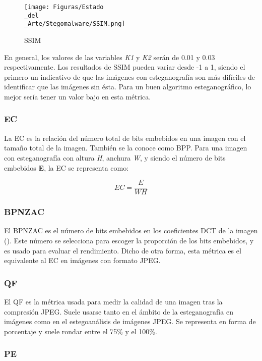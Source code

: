 \begin{figure}[H]
  \centering
  \texttt{[image: Figuras/Estado\\\_del\\\_Arte/Stegomalware/SSIM.png]}
  \label{fig:SSIM}
  \caption{SSIM}
\end{figure}

En general, los valores de las variables \textit{K1} y \textit{K2} serán de 0.01 y 0.03 respectivamente. Los resultados de \ac{SSIM} pueden variar desde -1 a 1, siendo el primero un indicativo de que las imágenes con esteganografía son más difíciles de identificar que las imágenes sin ésta. Para un buen algoritmo esteganográfico, lo mejor sería tener un valor bajo en esta métrica.

\subsubsection{EC}

La \ac{EC} es la relación del número total de bits embebidos en una imagen con el tamaño total de la imagen. También se la conoce como \ac{BPP}. Para una imagen con esteganografía con altura \textit{H}, anchura \textit{W}, y siendo el número de bits embebidos \textbf{E}, la \ac{EC} se representa como:

\begin{equation}
EC = \frac{E}{WH}
\end{equation}

\subsubsection{BPNZAC}

El \ac{BPNZAC} es el número de bits embebidos en los coeficientes \ac{DCT} de la imagen (\cite{dct}). Este número se selecciona para escoger la proporción de los bits embebidos, y es usado para evaluar el rendimiento. Dicho de otra forma, esta métrica es el equivalente al \ac{EC} en imágenes con formato JPEG. %

\subsubsection{QF}

El \ac{QF} es la métrica usada para medir la calidad de una imagen tras la compresión JPEG. Suele usarse tanto en el ámbito de la esteganografía en imágenes como en el estegoanálisis de imágenes JPEG. Se representa en forma de porcentaje y suele rondar entre el 75\% y el 100\%.

\subsubsection{PE}

